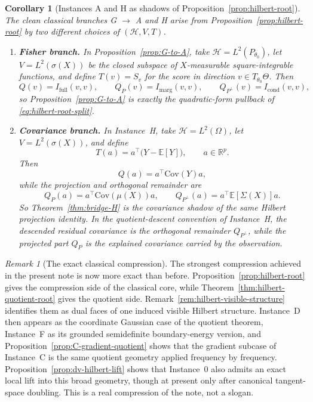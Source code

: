\documentclass[11pt,a4paper]{article}
\numberwithin{equation}{section}
\newcommand{\R}{\mathbb{R}}
\theoremstyle{thmcompact}
\newtheorem{corollary}[theorem]{Corollary}
\theoremstyle{remark}
\newtheorem*{remarkplain}{Remark}
\newenvironment{remark}[1][]%
{\begin{remarkbox}\begin{remarkplain}[#1]\normalfont}
		{\end{remarkplain}\end{remarkbox}}
\begin{document}
\begin{corollary}[Instances A and H as shadows of Proposition~\ref{prop:hilbert-root}]\label{cor:hilbert-root-instances}
The clean classical branches G $\to$ A and H arise from Proposition~\ref{prop:hilbert-root} by two different choices of $(\mathcal{H},V,T)$.

\begin{enumerate}[label=\textup{(\roman*)}]
\item \textbf{Fisher branch.} In Proposition~\ref{prop:G-to-A}, take $\mathcal{H}=L^2(P_{\theta_0})$, let $V=L^2(\sigma(X))$ be the closed subspace of $X$-measurable square-integrable functions, and define $T(v)=S_v$ for the score in direction $v \in T_{\theta_0}\Theta$. Then
\[
Q(v)=I_{\mathrm{full}}(v,v), \qquad
Q_P(v)=I_{\mathrm{marg}}(v,v), \qquad
Q_{P^\perp}(v)=I_{\mathrm{cond}}(v,v),
\]
so Proposition~\ref{prop:G-to-A} is exactly the quadratic-form pullback of \eqref{eq:hilbert-root-split}.

\item \textbf{Covariance branch.} In Instance~H, take $\mathcal{H}=L^2(\Omega)$, let $V=L^2(\sigma(X))$, and define
\[
T(a)=a^\top\bigl(Y-\mathbb{E}[Y]\bigr), \qquad a \in \R^p.
\]
Then
\[
Q(a)=a^\top \mathrm{Cov}(Y)a,
\]
while the projection and orthogonal remainder are
\[
Q_P(a)=a^\top \mathrm{Cov}(\mu(X))a, \qquad
Q_{P^\perp}(a)=a^\top \mathbb{E}[\Sigma(X)]a.
\]
So Theorem~\ref{thm:bridge-H} is the covariance shadow of the same Hilbert projection identity. In the quotient-descent convention of Instance~H, the descended residual covariance is the orthogonal remainder $Q_{P^\perp}$, while the projected part $Q_P$ is the explained covariance carried by the observation.
\end{enumerate}
\end{corollary}

\begin{remark}[The exact classical compression]\label{rem:hilbert-compression}
The strongest compression achieved in the present note is now more exact than before. Proposition~\ref{prop:hilbert-root} gives the compression side of the classical core, while Theorem~\ref{thm:hilbert-quotient-root} gives the quotient side. Remark~\ref{rem:hilbert-visible-structure} identifies them as dual faces of one induced visible Hilbert structure. Instance~D then appears as the coordinate Gaussian case of the quotient theorem, Instance~F as its grounded semidefinite boundary-energy version, and Proposition~\ref{prop:C-gradient-quotient} shows that the gradient subcase of Instance~C is the same quotient geometry applied frequency by frequency. Proposition~\ref{prop:dv-hilbert-lift} shows that Instance~0 also admits an exact local lift into this broad geometry, though at present only after canonical tangent-space doubling. This is a real compression of the note, not a slogan.
\end{remark}
\end{document}
